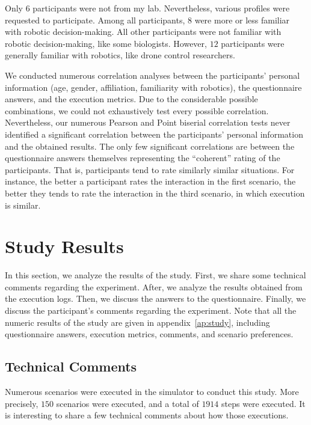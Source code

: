 Only $6$ participants were not from my lab. Nevertheless, various profiles were requested to participate. Among all participants, $8$ were more or less familiar with robotic decision-making. All other participants were not familiar with robotic decision-making, like some biologists. However, $12$ participants were generally familiar with robotics, like drone control researchers.  

We conducted numerous correlation analyses between the participants' personal information (age, gender, affiliation, familiarity with robotics), the questionnaire answers, and the execution metrics. Due to the considerable possible combinations, we could not exhaustively test every possible correlation. Nevertheless, our numerous Pearson and Point biserial correlation tests never identified a significant correlation between the participants' personal information and the obtained results. The only few significant correlations are between the questionnaire answers themselves representing the ``coherent'' rating of the participants. That is, participants tend to rate similarly similar situations. For instance, the better a participant rates the interaction in the first scenario, the better they tends to rate the interaction in the third scenario, in which execution is similar.


\section{Study Results}

In this section, we analyze the results of the study. First, we share some technical comments regarding the experiment. After, we analyze the results obtained from the execution logs. Then, we discuss the answers to the questionnaire. Finally, we discuss the participant's comments regarding the experiment. Note that all the numeric results of the study are given in appendix~\ref{ap:study}, including questionnaire answers, execution metrics, comments, and scenario preferences. 

\subsection{Technical Comments}

Numerous scenarios were executed in the simulator to conduct this study. More precisely, $150$ scenarios were executed, and a total of $1914$ steps were executed. It is interesting to share a few technical comments about how those executions.

